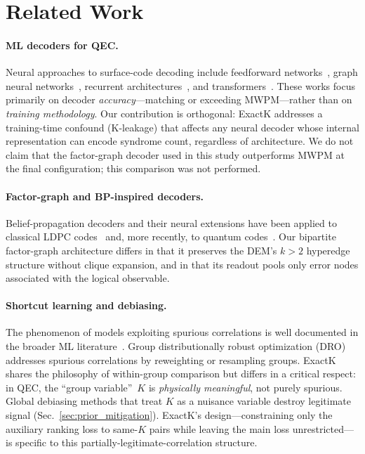 
\section{Related Work}

\paragraph{ML decoders for QEC.} Neural approaches to surface-code decoding include feedforward networks~\cite{PLACEHOLDER_mlp_decoder}, graph neural networks~\cite{PLACEHOLDER_gnn_decoder}, recurrent architectures~\cite{PLACEHOLDER_rnn_decoder}, and transformers~\cite{PLACEHOLDER_transformer_decoder}. These works focus primarily on decoder \emph{accuracy}---matching or exceeding MWPM---rather than on \emph{training methodology}. Our contribution is orthogonal: ExactK addresses a training-time confound (K-leakage) that affects any neural decoder whose internal representation can encode syndrome count, regardless of architecture. We do not claim that the factor-graph decoder used in this study outperforms MWPM at the final configuration; this comparison was not performed.

\paragraph{Factor-graph and BP-inspired decoders.} Belief-propagation decoders and their neural extensions have been applied to classical LDPC codes~\cite{PLACEHOLDER_bp_neural} and, more recently, to quantum codes~\cite{PLACEHOLDER_bp_quantum}. Our bipartite factor-graph architecture differs in that it preserves the DEM's $k{>}2$ hyperedge structure without clique expansion, and in that its readout pools only error nodes associated with the logical observable.

\paragraph{Shortcut learning and debiasing.} The phenomenon of models exploiting spurious correlations is well documented in the broader ML literature~\cite{PLACEHOLDER_shortcut_learning}. Group distributionally robust optimization (DRO)~\cite{PLACEHOLDER_group_dro} addresses spurious correlations by reweighting or resampling groups. ExactK shares the philosophy of within-group comparison but differs in a critical respect: in QEC, the ``group variable''~$K$ is \emph{physically meaningful}, not purely spurious. Global debiasing methods that treat $K$ as a nuisance variable destroy legitimate signal (Sec.~\ref{sec:prior_mitigation}). ExactK's design---constraining only the auxiliary ranking loss to same-$K$ pairs while leaving the main loss unrestricted---is specific to this partially-legitimate-correlation structure.

